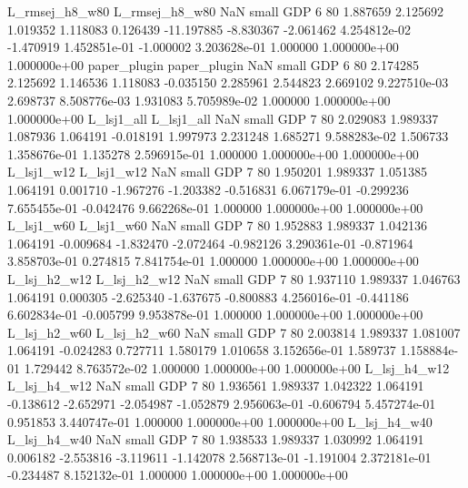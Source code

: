 L_rmsej_h8_w80 L_rmsej_h8_w80                   NaN      small      GDP                 6 80 1.887659       2.125692 1.019352       1.118083    0.126439    -11.197885     -8.830367    -2.061462   4.254812e-02 -1.470919 1.452851e-01    -1.000002   3.203628e-01            1.000000    1.000000e+00        1.000000e+00
  paper_plugin   paper_plugin                   NaN      small      GDP                 6 80 2.174285       2.125692 1.146536       1.118083   -0.035150      2.285961      2.544823     2.669102   9.227510e-03  2.698737 8.508776e-03     1.931083   5.705989e-02            1.000000    1.000000e+00        1.000000e+00
    L_lsj1_all     L_lsj1_all                   NaN      small      GDP                 7 80 2.029083       1.989337 1.087936       1.064191   -0.018191      1.997973      2.231248     1.685271   9.588283e-02  1.506733 1.358676e-01     1.135278   2.596915e-01            1.000000    1.000000e+00        1.000000e+00
    L_lsj1_w12     L_lsj1_w12                   NaN      small      GDP                 7 80 1.950201       1.989337 1.051385       1.064191    0.001710     -1.967276     -1.203382    -0.516831   6.067179e-01 -0.299236 7.655455e-01    -0.042476   9.662268e-01            1.000000    1.000000e+00        1.000000e+00
    L_lsj1_w60     L_lsj1_w60                   NaN      small      GDP                 7 80 1.952883       1.989337 1.042136       1.064191   -0.009684     -1.832470     -2.072464    -0.982126   3.290361e-01 -0.871964 3.858703e-01     0.274815   7.841754e-01            1.000000    1.000000e+00        1.000000e+00
  L_lsj_h2_w12   L_lsj_h2_w12                   NaN      small      GDP                 7 80 1.937110       1.989337 1.046763       1.064191    0.000305     -2.625340     -1.637675    -0.800883   4.256016e-01 -0.441186 6.602834e-01    -0.005799   9.953878e-01            1.000000    1.000000e+00        1.000000e+00
  L_lsj_h2_w60   L_lsj_h2_w60                   NaN      small      GDP                 7 80 2.003814       1.989337 1.081007       1.064191   -0.024283      0.727711      1.580179     1.010658   3.152656e-01  1.589737 1.158884e-01     1.729442   8.763572e-02            1.000000    1.000000e+00        1.000000e+00
  L_lsj_h4_w12   L_lsj_h4_w12                   NaN      small      GDP                 7 80 1.936561       1.989337 1.042322       1.064191   -0.138612     -2.652971     -2.054987    -1.052879   2.956063e-01 -0.606794 5.457274e-01     0.951853   3.440747e-01            1.000000    1.000000e+00        1.000000e+00
  L_lsj_h4_w40   L_lsj_h4_w40                   NaN      small      GDP                 7 80 1.938533       1.989337 1.030992       1.064191    0.006182     -2.553816     -3.119611    -1.142078   2.568713e-01 -1.191004 2.372181e-01    -0.234487   8.152132e-01            1.000000    1.000000e+00        1.000000e+00
